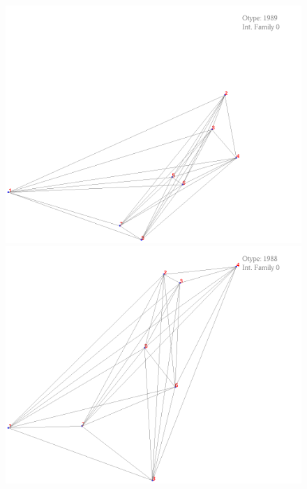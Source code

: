 \documentclass[11pt,epsf,times,letterpaper]{article}
\begin{document}
	\begin{figure}
		\includegraphics[scale=.4]{if_tam0_tam1/21.png}
		\includegraphics[scale=.4]{if_tam0_tam1/22.png}
	\end{figure}
	
\end{document}
